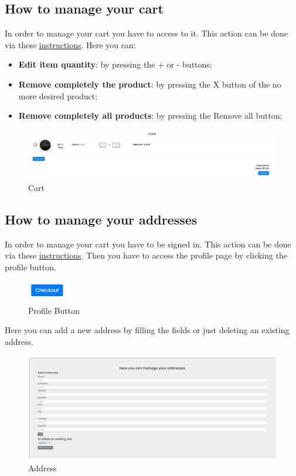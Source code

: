 \subsection{How to manage your cart} \label{_cart}
In order to manage your cart you have to access to it. This action can be done via these \hyperref[_checkcart]{instructions}.
Here you can:
\begin{itemize} 
    \item \textbf{Edit item quantity}: by pressing the + or - buttons;
    \item \textbf{Remove completely the product}: by pressing the X button of the no more desired product;
    \item \textbf{Remove completely all products}: by pressing the Remove all button;  
\end{itemize}
\begin{figure}[H]
    \centering
    \includegraphics[width=\linewidth]{res/images/cliente/cart.png}
    \caption{Cart}
\end{figure}

\subsection{How to manage your addresses} \label{_addresses}
In order to manage your cart you have to be signed in. This action can be done via these \hyperref[_signin]{instructions}.
Then you have to access the profile page by clicking the profile button.
\begin{figure}[H]
    \centering
    \includegraphics[width=5em]{res/images/cliente/profilebutton.png}
    \caption{Profile Button}
\end{figure}

Here you can add a new address by filling the fields or just deleting an existing address. 
\begin{figure}[H]
    \centering
    \includegraphics[width=\linewidth]{res/images/cliente/address.png}
    \caption{Address}
\end{figure}

